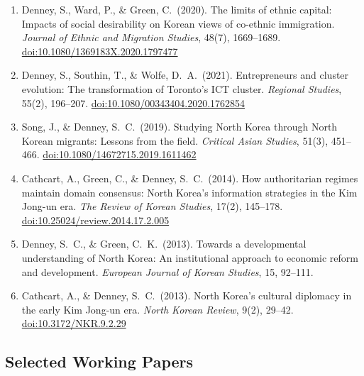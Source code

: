 \documentclass[11pt, a4paper]{article}
\begin{document}
\begin{enumerate}[itemsep=0.15em]
  \item Denney, S., Ward, P., \& Green, C.\ (2020). The limits of ethnic capital: Impacts of social desirability on Korean views of co-ethnic immigration. \textit{Journal of Ethnic and Migration Studies}, 48(7), 1669--1689. \href{https://doi.org/10.1080/1369183X.2020.1797477}{doi:10.1080/1369183X.2020.1797477}

  \item Denney, S., Southin, T., \& Wolfe, D.\ A.\ (2021). Entrepreneurs and cluster evolution: The transformation of Toronto's ICT cluster. \textit{Regional Studies}, 55(2), 196--207. \href{https://doi.org/10.1080/00343404.2020.1762854}{doi:10.1080/00343404.2020.1762854}

  \item Song, J., \& Denney, S.\ C.\ (2019). Studying North Korea through North Korean migrants: Lessons from the field. \textit{Critical Asian Studies}, 51(3), 451--466. \href{https://doi.org/10.1080/14672715.2019.1611462}{doi:10.1080/14672715.2019.1611462}

  \item Cathcart, A., Green, C., \& Denney, S.\ C.\ (2014). How authoritarian regimes maintain domain consensus: North Korea's information strategies in the Kim Jong-un era. \textit{The Review of Korean Studies}, 17(2), 145--178. \href{https://doi.org/10.25024/review.2014.17.2.005}{doi:10.25024/review.2014.17.2.005}

  \item Denney, S.\ C., \& Green, C.\ K.\ (2013). Towards a developmental understanding of North Korea: An institutional approach to economic reform and development. \textit{European Journal of Korean Studies}, 15, 92--111.

  \item Cathcart, A., \& Denney, S.\ C.\ (2013). North Korea's cultural diplomacy in the early Kim Jong-un era. \textit{North Korean Review}, 9(2), 29--42. \href{https://doi.org/10.3172/NKR.9.2.29}{doi:10.3172/NKR.9.2.29}
\end{enumerate}

\subsection{Selected Working Papers}
\end{document}
